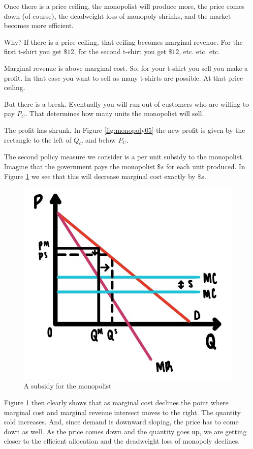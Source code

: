 \documentclass[
]{book}
\begin{document}
Once there is a price ceiling, the monopolist will produce more, the price comes down (of course), the deadweight loss of monopoly shrinks, and the market becomes more efficient.

Why? If there is a price ceiling, that ceiling becomes marginal revenue. For the first t-shirt you get \(\$12\), for the second t-shirt you get \(\$12\), etc. etc. etc.

Marginal revenue is above marginal cost. So, for your t-shirt you sell you make a profit. In that case you want to sell as many t-shirts are possible. At that price ceiling.

But there is a break. Eventually you will run out of customers who are willing to pay \(P_C\). That determines how many units the monopolist will sell.

The profit has shrunk. In Figure \ref{fig:monopoly05} the new profit is given by the rectangle to the left of \(Q_C\) and below \(P_C\).

The second policy measure we consider is a per unit subsidy to the monopolist. Imagine that the government pays the monopolist \(\$s\) for each unit produced. In Figure \ref{fig:monopoly06} we see that this will decrease marginal cost exactly by \(\$s\).

\begin{figure}

{\centering \includegraphics[width=0.5\linewidth]{img/monopoly/fig6} 

}

\caption{A subsidy for the monopolist}\label{fig:monopoly06}
\end{figure}

Figure \ref{fig:monopoly06} then clearly shows that as marginal cost declines the point where marginal cost and marginal revenue intersect moves to the right. The quantity sold increases. And, since demand is downward sloping, the price has to come down as well. As the price comes down and the quantity goes up, we are getting closer to the efficient allocation and the deadweight loss of monopoly declines.
\end{document}
